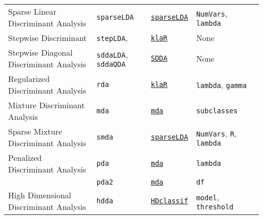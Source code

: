 \documentclass[12pt]{article}
\begin{document}
\begin{landscape}
\begin{longtable}{lllll}
      Sparse Linear Discriminant Analysis&
         \texttt{sparseLDA} & 
              {\tt \href{http://cran.r-project.org/web/packages/sparseLDA/index.html}{sparseLDA}}      &          
            \texttt{NumVars}, \texttt{lambda} & \\  

\rowcolor[rgb]{.95, .95, .95}               
       Stepwise Discriminant&
        \texttt{stepLDA}, &
         {\tt \href{http://cran.r-project.org/web/packages/klaR/index.html}{klaR}}   &
        None & \\
      
      Stepwise Diagonal Discriminant Analysis&
        \texttt{sddaLDA}, \texttt{sddaQDA}&
         {\tt \href{http://cran.r-project.org/web/packages/SDDA/index.html}{SDDA}}&
        None & \\
            
\rowcolor[rgb]{.95, .95, .95}                     
      Regularized Discriminant Analysis &
         \texttt{rda} & 
             {\tt \href{http://cran.r-project.org/web/packages/klaR/index.html}{klaR}}      & 
            \texttt{lambda}, \texttt{gamma} & \\
      
      Mixture Discriminant Analysis &
         \texttt{mda} & 
             {\tt \href{http://cran.r-project.org/web/packages/mda/index.html}{mda}}        & 
            \texttt{subclasses} & \\

\rowcolor[rgb]{.95, .95, .95}         
      Sparse Mixture Discriminant Analysis&
         \texttt{smda} & 
             {\tt \href{http://cran.r-project.org/web/packages/sparseLDA/index.html}{sparseLDA}}        &          
            \texttt{NumVars}, \texttt{R}, \texttt{lambda} & \\  
      
      Penalized Discriminant Analysis &
         \texttt{pda} & 
             {\tt \href{http://cran.r-project.org/web/packages/mda/index.html}{mda}}      & 
            \texttt{lambda} & \\
 
        & \texttt{pda2} & 
             {\tt \href{http://cran.r-project.org/web/packages/mda/index.html}{mda}}       & 
            \texttt{df} & \\ 
            
\rowcolor[rgb]{.95, .95, .95}     
                  High Dimensional Discriminant Analysis &
         \texttt{hdda} & 
             {\tt \href{http://cran.r-project.org/web/packages/HDclassif/index.html}{HDclassif}}      & 
            \texttt{model}, \texttt{threshold} & \\
            

\end{longtable}
\end{landscape}
\end{document}
